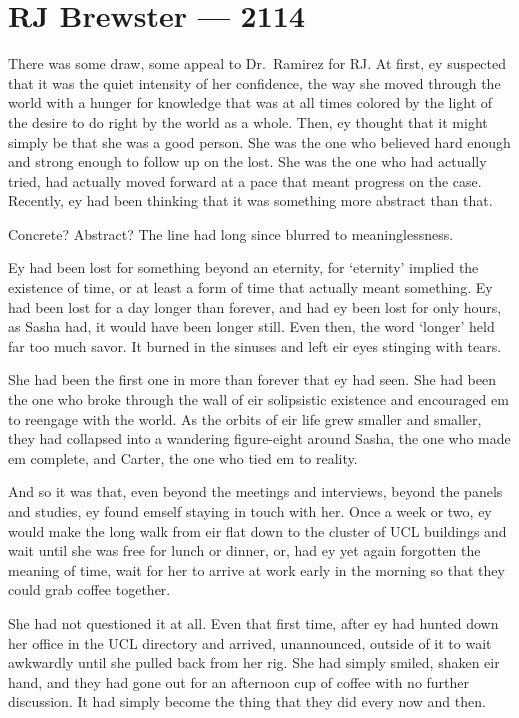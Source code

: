 \hypertarget{rj-brewster-2114}{%
\chapter{RJ Brewster — 2114}\label{rj-brewster-2114}}

There was some draw, some appeal to Dr.~Ramirez for RJ. At first, ey suspected that it was the quiet intensity of her confidence, the way she moved through the world with a hunger for knowledge that was at all times colored by the light of the desire to do right by the world as a whole. Then, ey thought that it might simply be that she was a good person. She was the one who believed hard enough and strong enough to follow up on the lost. She was the one who had actually tried, had actually moved forward at a pace that meant progress on the case. Recently, ey had been thinking that it was something more abstract than that.

Concrete? Abstract? The line had long since blurred to meaninglessness.

Ey had been lost for something beyond an eternity, for `eternity' implied the existence of time, or at least a form of time that actually meant something. Ey had been lost for a day longer than forever, and had ey been lost for only hours, as Sasha had, it would have been longer still. Even then, the word `longer' held far too much savor. It burned in the sinuses and left eir eyes stinging with tears.

She had been the first one in more than forever that ey had seen. She had been the one who broke through the wall of eir solipsistic existence and encouraged em to reengage with the world. As the orbits of eir life grew smaller and smaller, they had collapsed into a wandering figure-eight around Sasha, the one who made em complete, and Carter, the one who tied em to reality.

And so it was that, even beyond the meetings and interviews, beyond the panels and studies, ey found emself staying in touch with her. Once a week or two, ey would make the long walk from eir flat down to the cluster of UCL buildings and wait until she was free for lunch or dinner, or, had ey yet again forgotten the meaning of time, wait for her to arrive at work early in the morning so that they could grab coffee together.

She had not questioned it at all. Even that first time, after ey had hunted down her office in the UCL directory and arrived, unannounced, outside of it to wait awkwardly until she pulled back from her rig. She had simply smiled, shaken eir hand, and they had gone out for an afternoon cup of coffee with no further discussion. It had simply become the thing that they did every now and then.

